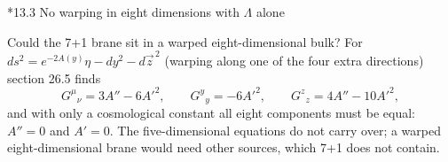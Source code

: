\documentclass[10pt,a4paper]{article}
\makeatletter
\renewcommand\subsection{\@startsection{subsection}{2}{\z@}{-3.25ex\@plus -1ex \@minus -.2ex}{1.5ex \@plus .2ex}{\normalfont\large\bfseries\raggedright}}
\makeatother
\begin{document}
\subsection*{13.3 No warping in eight dimensions with \texorpdfstring{$\Lambda$}{} alone}
Could the 7+1 brane sit in a warped eight-dimensional bulk? For $ds^2=e^{-2A(y)}\eta-dy^2-d\vec z^{\,2}$ (warping along one of the four extra directions) section 26.5 finds
\begin{equation*}
G^\mu{}_\nu=3A''-6A'^2,\qquad G^y{}_y=-6A'^2,\qquad G^z{}_z=4A''-10A'^2,
\end{equation*}
and with only a cosmological constant all eight components must be equal: $A''=0$ and $A'=0$. The five-dimensional equations do not carry over; a warped eight-dimensional brane would need other sources, which 7+1 does not contain.
\end{document}
